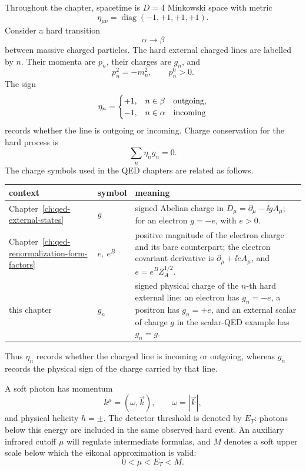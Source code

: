 Throughout the chapter, spacetime is \(D=4\) Minkowski space with metric
\[
  \eta_{\mu\nu}=\operatorname{diag}(-1,+1,+1,+1).
\]
Consider a hard transition
\[
  \alpha\longrightarrow\beta
\]
between massive charged particles.  The hard external charged lines are
labelled by \(n\).  Their momenta are \(p_n\), their charges are \(g_n\), and
\[
  p_n^2=-m_n^2,\qquad p_n^0>0 .
\]
The sign
\[
  \eta_n=
  \begin{cases}
    +1,& n\in\beta\quad\hbox{outgoing},\\
    -1,& n\in\alpha\quad\hbox{incoming}
  \end{cases}
\]
records whether the line is outgoing or incoming.  Charge conservation for
the hard process is
\[
  \sum_n \eta_n g_n=0 .
\]
The charge symbols used in the QED chapters are related as follows.
\begin{center}
\begin{tabular}{p{}|p{}|p{}}
context & symbol & meaning \\
\hline
Chapter~\ref{ch:qed-external-states}
  & \(g\)
  & signed Abelian charge in \(D_\mu=\partial_\mu-\ii gA_\mu\);
    for an electron \(g=-e\), with \(e>0\). \\
Chapter~\ref{ch:qed-renormalization-form-factors}
  & \(e,\ e^B\)
  & positive magnitude of the electron charge and its bare counterpart; the
    electron covariant derivative is \(\partial_\mu+\ii eA_\mu\), and
    \(e=e^B Z_A^{1/2}\). \\
this chapter
  & \(g_n\)
  & signed physical charge of the \(n\)-th hard external line; an electron has
    \(g_n=-e\), a positron has \(g_n=+e\), and an external scalar of charge
    \(g\) in the scalar-QED example has \(g_n=g\).
\end{tabular}
\end{center}
Thus \(\eta_n\) records whether the charged line is incoming or outgoing,
whereas \(g_n\) records the physical sign of the charge carried by that line.

A soft photon has momentum
\[
  k^\mu=(\omega,\vec k),\qquad \omega=|\vec k|,
\]
and physical helicity \(h=\pm\).  The detector threshold is denoted by
\(E_T\): photons below this energy are included in the same observed hard
event.  An auxiliary infrared cutoff \(\mu\) will regulate intermediate
formulas, and \(M\) denotes a soft upper scale below which the eikonal
approximation is valid:
\[
  0<\mu<E_T<M .
\]

